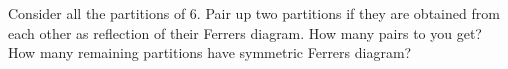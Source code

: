 Consider all the partitions of $6$.
Pair up two partitions if they are obtained from each other
as reflection of their Ferrers diagram.
How many pairs to you get?
How many remaining partitions have symmetric Ferrers diagram?
